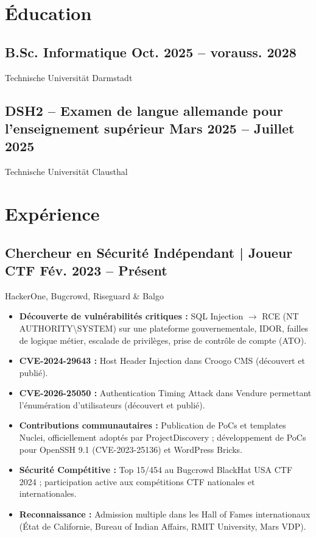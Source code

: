 \documentclass[a4paper,10pt]{article}
\newcommand{\subtext}[1]{#1\par\vspace{-0.2cm}}
\newenvironment{zitemize}{
    \begin{itemize}[leftmargin=*, labelsep=0.5em, itemsep=0pt, parsep=1pt]
}{\end{itemize}\vspace{-0.2cm}}
\begin{document}
\section{Éducation}
\subsection*{B.Sc. Informatique \hfill Oct. 2025 -- vorauss. 2028} 
\subtext{Technische Universität Darmstadt}

\subsection*{DSH2 -- Examen de langue allemande pour l'enseignement supérieur \hfill Mars 2025 -- Juillet 2025} 
\subtext{Technische Universität Clausthal}

\section{Expérience}
\subsection*{Chercheur en Sécurité Indépendant | Joueur CTF \hfill Fév. 2023 -- Présent} 
\subtext{HackerOne, Bugcrowd, Riseguard \& Balgo} 
\begin{zitemize}
    \item \textbf{Découverte de vulnérabilités critiques :} SQL Injection $\rightarrow$ RCE (NT AUTHORITY\textbackslash SYSTEM) sur une plateforme gouvernementale, IDOR, failles de logique métier, escalade de privilèges, prise de contrôle de compte (ATO).
    \item \textbf{CVE-2024-29643 :} Host Header Injection dans Croogo CMS (découvert et publié).
    \item \textbf{CVE-2026-25050 :} Authentication Timing Attack dans Vendure permettant l'énumération d'utilisateurs (découvert et publié).
    \item \textbf{Contributions communautaires :} Publication de PoCs et templates Nuclei, officiellement adoptés par ProjectDiscovery ; développement de PoCs pour OpenSSH 9.1 (CVE-2023-25136) et WordPress Bricks.
    \item \textbf{Sécurité Compétitive :} Top 15/454 au Bugcrowd BlackHat USA CTF 2024 ; participation active aux compétitions CTF nationales et internationales.
    \item \textbf{Reconnaissance :} Admission multiple dans les Hall of Fames internationaux (État de Californie, Bureau of Indian Affairs, RMIT University, Mars VDP).
\end{zitemize}
\end{document}
